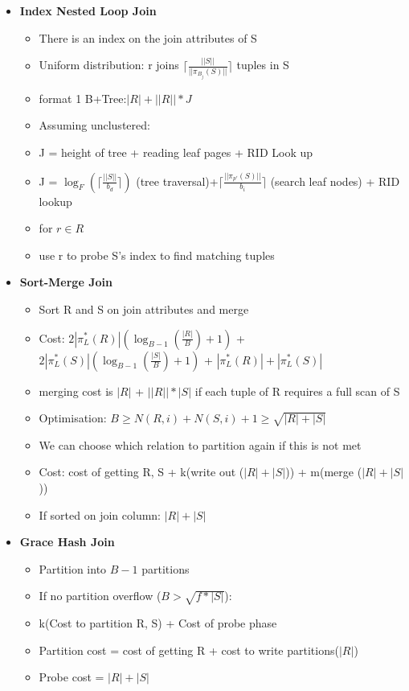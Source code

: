 \documentclass[10pt, landscape]{article}
\newcommand{\ceil}[1]{\lceil #1 \rceil}
\begin{document}
\begin{multicols}{4}
\begin{multicols}{2}
\begin{itemize}
      \item \textbf{Index Nested Loop Join} \newline
      \begin{itemize}
        \item There is an index on the join attributes of S
        \item Uniform distribution: r joins $\ceil{\frac{||S||}{||\pi_{B_j}(S)||}}$ tuples in S
        \item format 1 B+Tree:$|R| + ||R|| * J$
        \item Assuming unclustered:
        \item J = height of tree + reading leaf pages + RID Look up
        \item J = $\log_F(\ceil{\frac{||S||}{b_d}})$ (tree traversal)+$\ceil{\frac{||\pi_{p'}(S)||}{b_i}}$ (search leaf nodes) + RID lookup
        \item for $r \in R$ 
        \item use r to probe S's index to find matching tuples
      \end{itemize}

      \item \textbf{Sort-Merge Join} \newline
      \begin{itemize}
        \item Sort R and S on join attributes and merge
        \item Cost: $2|\pi^*_L(R)|(\log_{B-1}(\frac{|R|}{B})+1)$ + $2|\pi^*_L(S)|(\log_{B-1}(\frac{|S|}{B})+1)$ + $|\pi^*_L(R)|+|\pi^*_L(S)|$
        \item merging cost is $|R|$ + $||R||*|S|$ if each tuple of R requires a full scan of S
        \item Optimisation: $B \ge N(R,i) + N(S,i) + 1 \ge \sqrt{|R|+|S|}$ 
        \item We can choose which relation to partition again if this is not met
        \item Cost: cost of getting R, S + k(write out ($|R|+|S|$)) + m(merge ($|R|+|S|$))
        \item If sorted on join column: $|R|+|S|$
      \end{itemize}

      \item \textbf{Grace Hash Join} \newline
      \begin{itemize}
        \item Partition into $B-1$ partitions
        \item If no partition overflow ($B > \sqrt{f*|S|}$):
        \item k(Cost to partition R, S) + Cost of probe phase
        \item Partition cost = cost of getting R + cost to write partitions($|R|$)
        \item Probe cost = $|R| + |S|$
      \end{itemize}


\end{itemize}
\end{multicols}
\end{multicols}
\end{document}
